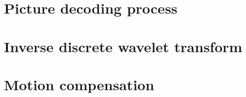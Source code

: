 
\section{Picture decoding process}

\clearpage
\section{Inverse discrete wavelet transform}

\clearpage
\section{Motion compensation}
